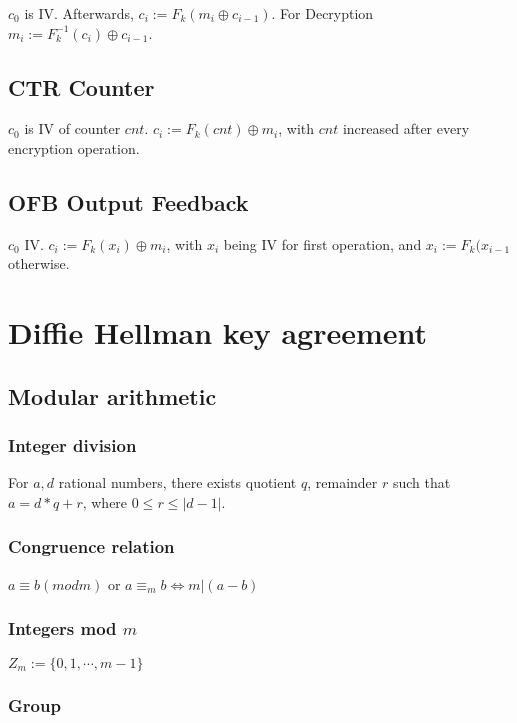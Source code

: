 \documentclass[a4paper]{scrreprt}
\begin{document}
$c_0$ is IV. Afterwards, $c_i := F_k(m_i \oplus c_{i-1})$. For Decryption $m_i
:= F^{-1}_k(c_i) \oplus c_{i - 1}$.

\section{CTR Counter}

$c_0$ is IV of counter $cnt$. $c_i := F_k(cnt) \oplus m_i$, with $cnt$
increased after every encryption operation.

\section{OFB Output Feedback}

$c_0$ IV. $c_i := F_k(x_i) \oplus m_i$, with $x_i$ being IV for first
operation, and $x_i := F_k(x_{i-1}$ otherwise.


\chapter{Diffie Hellman key agreement}

\section{Modular arithmetic}

\subsection{Integer division}

For $a, d$ rational numbers, there exists quotient $q$, remainder $r$ such that
$a = d * q + r$, where $0 \leq r \leq |d - 1|$.

\subsection{Congruence relation}

$a \equiv b (mod m)$ or $a \equiv_{m} b \Leftrightarrow m | (a - b)$

\subsection{Integers mod $m$}

$Z_m := \{0, 1, \cdots, m - 1\}$

\subsection{Group}
\end{document}
